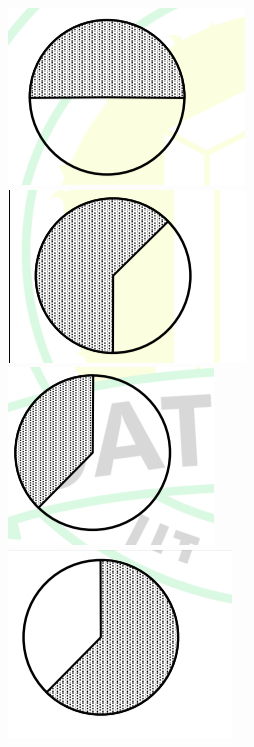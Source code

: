 \documentclass[journal,12pt,onecolumn]{IEEEtran}
\theoremstyle{remark}
\begin{document}
\begin{enumerate}
		\begin{figure}[h]
			\centering
			\begin{multicols}{2}
				\includegraphics[width=0.4\columnwidth]{q5A.png}\par
				\includegraphics[width=0.4\columnwidth]{q5B.png}\par
			\end{multicols}
			\begin{multicols}{2}
				\includegraphics[width=0.4\columnwidth]{q5C.png}\par
				\includegraphics[width=0.4\columnwidth]{q5D.png}\par
			\end{multicols}
			\caption*{}
			\label{fig:q5_options}
		\end{figure}
		

\end{enumerate}
\end{document}
